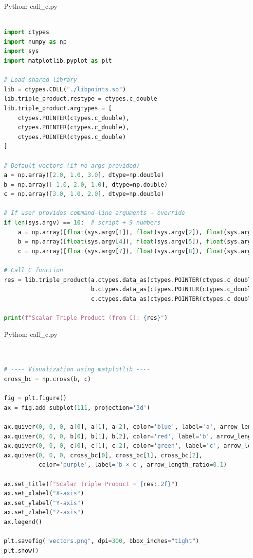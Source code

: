 \documentclass{beamer}
\numberwithin{equation}{section}
\theoremstyle{remark}
\begin{document}
\begin{frame}[fragile]{Python: call\_c.py}
\begin{lstlisting}[language=Python]

import ctypes
import numpy as np
import sys
import matplotlib.pyplot as plt

# Load shared library
lib = ctypes.CDLL("./libpoints.so")
lib.triple_product.restype = ctypes.c_double
lib.triple_product.argtypes = [
    ctypes.POINTER(ctypes.c_double),
    ctypes.POINTER(ctypes.c_double),
    ctypes.POINTER(ctypes.c_double)
]

# Default vectors (if no args provided)
a = np.array([2.0, 1.0, 3.0], dtype=np.double)
b = np.array([-1.0, 2.0, 1.0], dtype=np.double)
c = np.array([3.0, 1.0, 2.0], dtype=np.double)

# If user provides command-line arguments → override
if len(sys.argv) == 10:  # script + 9 numbers
    a = np.array([float(sys.argv[1]), float(sys.argv[2]), float(sys.argv[3])], dtype=np.double)
    b = np.array([float(sys.argv[4]), float(sys.argv[5]), float(sys.argv[6])], dtype=np.double)
    c = np.array([float(sys.argv[7]), float(sys.argv[8]), float(sys.argv[9])], dtype=np.double)

# Call C function
res = lib.triple_product(a.ctypes.data_as(ctypes.POINTER(ctypes.c_double)),
                         b.ctypes.data_as(ctypes.POINTER(ctypes.c_double)),
                         c.ctypes.data_as(ctypes.POINTER(ctypes.c_double)))

print(f"Scalar Triple Product (from C): {res}")

\end{lstlisting}
\end{frame}

\begin{frame}[fragile]{Python: call\_c.py}
\begin{lstlisting}[language=Python]


# ---- Visualization using matplotlib ----
cross_bc = np.cross(b, c)

fig = plt.figure()
ax = fig.add_subplot(111, projection='3d')

ax.quiver(0, 0, 0, a[0], a[1], a[2], color='blue', label='a', arrow_length_ratio=0.1)
ax.quiver(0, 0, 0, b[0], b[1], b[2], color='red', label='b', arrow_length_ratio=0.1)
ax.quiver(0, 0, 0, c[0], c[1], c[2], color='green', label='c', arrow_length_ratio=0.1)
ax.quiver(0, 0, 0, cross_bc[0], cross_bc[1], cross_bc[2],
          color='purple', label='b × c', arrow_length_ratio=0.1)

ax.set_title(f"Scalar Triple Product = {res:.2f}")
ax.set_xlabel("X-axis")
ax.set_ylabel("Y-axis")
ax.set_zlabel("Z-axis")
ax.legend()

plt.savefig("vectors.png", dpi=300, bbox_inches="tight")
plt.show()

\end{lstlisting}
\end{frame}
\end{document}
